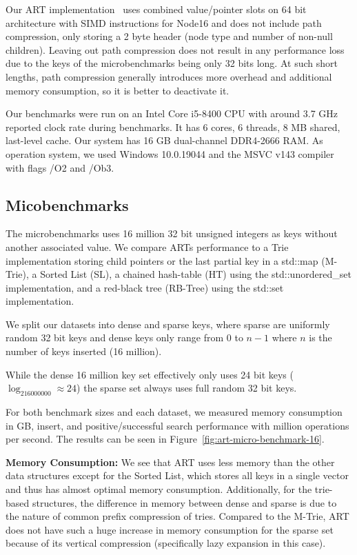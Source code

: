 \documentclass[acmtog, nonacm]{acmart}
\begin{document}
Our ART implementation~\cite{fritschart} uses combined value/pointer slots on 64 bit architecture with SIMD instructions for Node16 
and does not include path compression, only storing a 2 byte header (node type and number of non-null children).
Leaving out path compression does not result in any performance loss due to the keys of the microbenchmarks
being only 32 bits long. At such short lengths, path compression generally introduces more overhead and 
additional memory consumption, so it is better to deactivate it.

Our benchmarks were run on an Intel Core i5-8400 CPU with around 3.7 GHz reported clock rate during benchmarks.
It has 6 cores, 6 threads, 8 MB shared, last-level cache. Our system has 16 GB dual-channel DDR4-2666 RAM. As operation system, we used Windows 10.0.19044 and the MSVC v143 compiler with flags /O2 and /Ob3.

\subsection{Micobenchmarks}

The microbenchmarks uses 16 million 32 bit unsigned integers as keys without another associated value. We compare ARTs 
performance to a Trie implementation storing child pointers or the last partial key in a std::map (M-Trie), a 
Sorted List (SL), a chained hash-table (HT) using the std::unordered\_set implementation, and a red-black tree 
(RB-Tree) using the std::set implementation.

We split our datasets into dense and sparse keys, where sparse are uniformly random 32 bit keys and dense keys only
range from $0$ to $n-1$ where $n$ is the number of keys inserted (16 million).

While the dense 16 million key set effectively only uses 24 bit keys ($\log_216000000\approx24$)
the sparse set always uses full random 32 bit keys.

For both benchmark sizes and each dataset, we measured memory consumption in GB, insert, and positive/successful search performance with million operations per second. 
The results can be seen in Figure~\ref{fig:art-micro-benchmark-16}.

\textbf{Memory Consumption:} We see that ART uses less memory than the other data structures except for the Sorted List, which stores all keys in a single vector and thus has almost optimal memory consumption. Additionally, for the 
trie-based structures, the difference in memory between dense and sparse is due to the nature of common prefix
compression of tries. Compared to the M-Trie, ART does not have such a huge increase in memory consumption for the sparse set
because of its vertical compression (specifically lazy expansion in this case).
\end{document}
